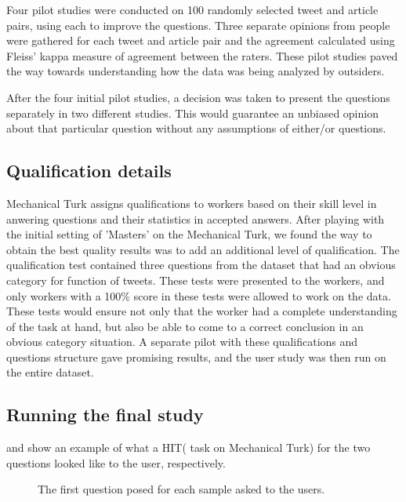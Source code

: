  Four pilot studies were conducted on 100 randomly selected tweet and article pairs, using each to improve the questions. Three separate opinions from people were gathered for each tweet and article pair and the agreement calculated using Fleiss' kappa measure of agreement between the raters. These pilot studies paved the way towards understanding how the data was being analyzed by outsiders. 
 
 After the four initial pilot studies, a decision was taken to present the questions separately in two different studies. This would guarantee an unbiased opinion about that particular question without any assumptions of either/or questions.

\subsection{Qualification details}

Mechanical Turk assigns qualifications to workers based on their skill level in anwering questions and their statistics in accepted answers. After playing with the initial setting of 'Masters' on the Mechanical Turk, we found the way to obtain the best quality results was to add an additional level of qualification. The qualification test contained three questions from the dataset that had an obvious category for function of tweets. These tests were presented to the workers, and only workers with a 100\% score in these tests were allowed to work on the data. These tests would ensure not only that the worker had a complete understanding of the task at hand, but also be able to come to a correct conclusion in an obvious category situation. A separate pilot with these qualifications and questions structure gave promising results, and the user study was then run on the entire dataset.

\subsection{Running the final study}

 and  show an example of what a HIT( task on Mechanical Turk) for the two questions looked like to the user, respectively.
\begin{figure}[!htbp]
  \centering 
  \subfloat{\texttt{[image: q11]}}
  \caption[User study question 1 example]{The first question posed for each sample asked to the users.}
  \label{fig:q1}
\end{figure}


